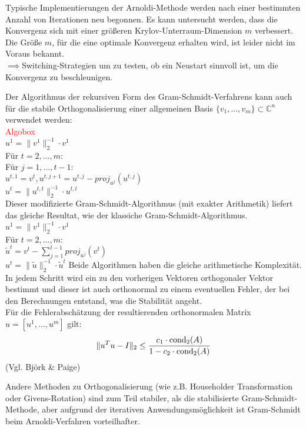 \begin{rembox}
    Typische Implementierungen der Arnoldi-Methode werden nach einer bestimmten Anzahl von Iterationen neu begonnen.
    Es kann untersucht werden, dass die Konvergenz sich mit einer größeren Krylov-Unterraum-Dimension $m$ verbessert.
    Die Größe $m$, für die eine optimale Konvergenz erhalten wird, ist leider nicht im Voraus bekannt. \\
    $\implies$\glqq{}Switching\grqq{}-Strategien um zu testen, ob ein Neustart sinnvoll ist, 
    um die Konvergenz zu beschleunigen.
\end{rembox}
\begin{rembox}
    Der Algorithmus der rekursiven Form des Gram-Schmidt-Verfahrens kann auch für die stabile Orthogonalisierung einer 
    allgemeinen Basis $\{v_1,\dots,v_m\}\subset\mathbb{C}^n$ verwendet werden:\\
    \textcolor{red}{Algobox} \\
    $u^1=\|v^1\|_2^{-1}\cdot v^1$ \\
    Für $t=2,...,m$:  \\
    Für $j=1,...,t-1$: \\
    $u^{t,1}=v^t, u^{t,j+1}=u^{t,j}-proj_{u^{j}}(u^{t,j})$ \\
    $u^t=\|u^{t,t}\|_2^{-1}\cdot u^{t,t}$ \\
    Dieser modifizierte Gram-Schmidt-Algorithmus (mit exakter Arithmetik) liefert das gleiche Resultat, 
    wie der klassiche Gram-Schmidt-Algorithmus. \\
    $u^1=\|v^1\|_2^{-1}\cdot v^1$ \\
    Für $t=2,...,m$: \\
    $\tilde{u}^t = v^t - \sum_{j=1}^{t-1} proj_{u^j}(v^t)$ \\
    $u^t = \|\tilde{u}\|_2^{-1}\cdot\tilde{u}^t$
    Beide Algorithmen haben die gleiche arithmetische Komplexität. \\
    In jedem Schritt wird ein zu den vorherigen Vektoren orthogonaler Vektor bestimmt und dieser ist auch orthonormal
    zu einem eventuellen Fehler, der bei den Berechnungen entstand, was die Stabilität angeht.\\
    Für die Fehlerabschätzung der resultierenden orthonormalen Matrix $u=[u^1,\dots,u^m]$ gilt:
    \[
        \|u^Tu-I\|_2 \leq \dfrac{c_1\cdot \text{cond}_2(A)}{1-c_2\cdot\text{cond}_2(A)}
    \]
    (Vgl. Björk \& Paige)
\end{rembox}
\begin{rembox}
    Andere Methoden zu Orthogonalisierung (wie z.B. Householder Transformation oder Givens-Rotation) sind zum Teil 
    stabiler, als die stabilisierte Gram-Schmidt-Methode, aber aufgrund der iterativen Anwendungsmöglichkeit ist 
    Gram-Schmidt beim Arnoldi-Verfahren vorteilhafter.
\end{rembox}


